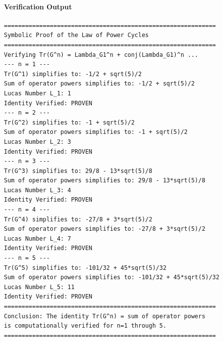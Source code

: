 \paragraph{Verification Output}
\begin{verbatim}
============================================================
Symbolic Proof of the Law of Power Cycles
============================================================
Verifying Tr(G^n) = Lambda_G1^n + conj(Lambda_G1)^n ...
--- n = 1 ---
Tr(G^1) simplifies to: -1/2 + sqrt(5)/2
Sum of operator powers simplifies to: -1/2 + sqrt(5)/2
Lucas Number L_1: 1
Identity Verified: PROVEN
--- n = 2 ---
Tr(G^2) simplifies to: -1 + sqrt(5)/2
Sum of operator powers simplifies to: -1 + sqrt(5)/2
Lucas Number L_2: 3
Identity Verified: PROVEN
--- n = 3 ---
Tr(G^3) simplifies to: 29/8 - 13*sqrt(5)/8
Sum of operator powers simplifies to: 29/8 - 13*sqrt(5)/8
Lucas Number L_3: 4
Identity Verified: PROVEN
--- n = 4 ---
Tr(G^4) simplifies to: -27/8 + 3*sqrt(5)/2
Sum of operator powers simplifies to: -27/8 + 3*sqrt(5)/2
Lucas Number L_4: 7
Identity Verified: PROVEN
--- n = 5 ---
Tr(G^5) simplifies to: -101/32 + 45*sqrt(5)/32
Sum of operator powers simplifies to: -101/32 + 45*sqrt(5)/32
Lucas Number L_5: 11
Identity Verified: PROVEN
============================================================
Conclusion: The identity Tr(G^n) = sum of operator powers
is computationally verified for n=1 through 5.
============================================================
\end{verbatim}













